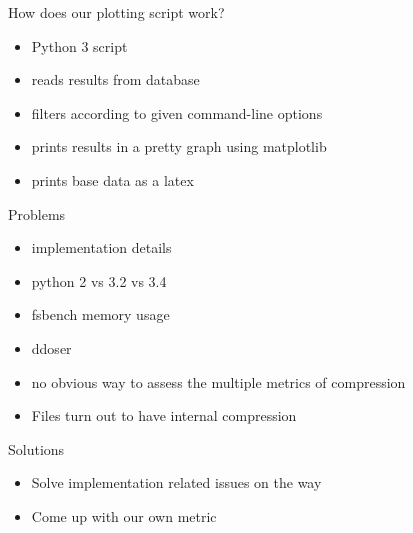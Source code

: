 \documentclass[10pt, compress]{beamer}
\begin{document}
\begin{frame}{How does our plotting script work?}
    \begin{itemize}
        \item Python 3 script
        \item reads results from database
        \item filters according to given command-line options
        \item prints results in a pretty graph using matplotlib
        \item prints base data as a latex 
    \end{itemize}    
\end{frame}

\begin{frame}{Problems}
    \begin{itemize}  
        \item implementation details
        \item python 2 vs 3.2 vs 3.4
        \item fsbench memory usage
        \item ddoser
        \item no obvious way to assess the multiple metrics of compression
        \item Files turn out to have internal compression
    \end{itemize}
\end{frame}

\begin{frame}{Solutions}
    \begin{itemize}
        \item Solve implementation related issues on the way
        \item Come up with our own metric
    \end{itemize}
\end{frame}
\end{document}
